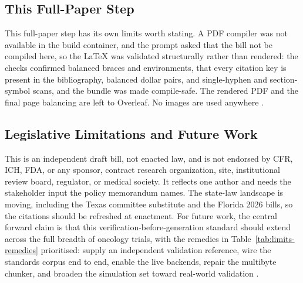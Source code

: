 \subsection{This Full-Paper Step}

This full-paper step has its own limits worth stating. A PDF compiler was not
available in the build container, and the prompt asked that the bill not be
compiled here, so the LaTeX was validated structurally rather than rendered: the
checks confirmed balanced braces and environments, that every citation key is
present in the bibliography, balanced dollar pairs, and single-hyphen and
section-symbol scans, and the bundle was made compile-safe. The rendered PDF and
the final page balancing are left to Overleaf. No images are used anywhere
\cite{lamport1994latex}.

\subsection{Legislative Limitations and Future Work}

This is an independent draft bill, not enacted law, and is not endorsed by CFR,
ICH, FDA, or any sponsor, contract research organization, site, institutional
review board, regulator, or medical society. It reflects one author and needs the
stakeholder input the policy memorandum names. The state-law landscape is moving,
including the Texas committee substitute and the Florida 2026 bills, so the
citations should be refreshed at enactment. For future work, the central forward
claim is that this verification-before-generation standard should extend across
the full breadth of oncology trials, with the remedies in
Table~\ref{tab:limits-remedies} prioritised: supply an independent validation
reference, wire the standards corpus end to end, enable the live backends, repair
the multibyte chunker, and broaden the simulation set toward real-world
validation \cite{kawchak2026bills, kawchak2026prediction, fda2026realtime}.

